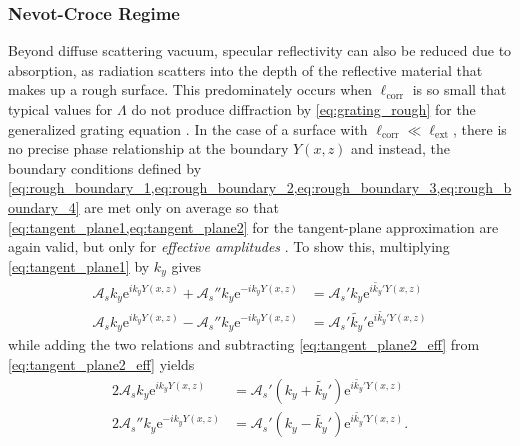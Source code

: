 \subsubsection{Nevot-Croce Regime}\label{sec:NC_factor}
Beyond diffuse scattering vacuum, specular reflectivity can also be reduced due to absorption, as radiation scatters into the depth of the reflective material that makes up a rough surface. 
This predominately occurs when $\ell_{\text{corr}}$ is so small that typical values for $\Lambda$ do not produce diffraction by \cref{eq:grating_rough} for the generalized grating equation \cite{deBoer95}. 
In the case of a surface with $\ell_{\text{corr}} \ll \ell_{\text{ext}}$, there is no precise phase relationship at the boundary $Y (x,z)$ and instead, the boundary conditions defined by \cref{eq:rough_boundary_1,eq:rough_boundary_2,eq:rough_boundary_3,eq:rough_boundary_4} are met only on average so that \cref{eq:tangent_plane1,eq:tangent_plane2} for the tangent-plane approximation are again valid, but only for \emph{effective amplitudes} \cite{Gibaud2009}. 
To show this, multiplying \cref{eq:tangent_plane1} by $k_y$ gives 
\begin{subequations}
\begin{align}
 \mathcal{A}_s k_y \mathrm{e}^{i k_y Y(x,z)} + \mathcal{A}_s'' k_y \mathrm{e}^{-i k_y Y(x,z)} &= \mathcal{A}_s' k_y \mathrm{e}^{i \tilde{k_y}' Y(x,z)} \label{eq:tangent_plane1_eff} \\
 \mathcal{A}_s k_y \mathrm{e}^{i k_y Y(x,z)} - \mathcal{A}_s'' k_y \mathrm{e}^{-i k_y Y(x,z)} &= \mathcal{A}_s' \tilde{k_y}' \mathrm{e}^{i \tilde{k_y}' Y(x,z)} \label{eq:tangent_plane2_eff} 
 \end{align}
\end{subequations}
while adding the two relations and subtracting \cref{eq:tangent_plane2_eff} from \cref{eq:tangent_plane2_eff} yields 
\begin{subequations}
\begin{align}
 2 \mathcal{A}_s k_y \mathrm{e}^{i k_y Y(x,z)} &= \mathcal{A}_s' \left( k_y + \tilde{k_y}' \right) \mathrm{e}^{i \tilde{k_y}' Y(x,z)}  \label{eq:tangent_plane1_eff_comb} \\
 2 \mathcal{A}_s'' k_y \mathrm{e}^{-i k_y Y(x,z)} &= \mathcal{A}_s' \left( k_y - \tilde{k_y}' \right) \mathrm{e}^{i \tilde{k_y}' Y(x,z)}  \label{eq:tangent_plane2_eff_comb} .
 \end{align}
\end{subequations}

